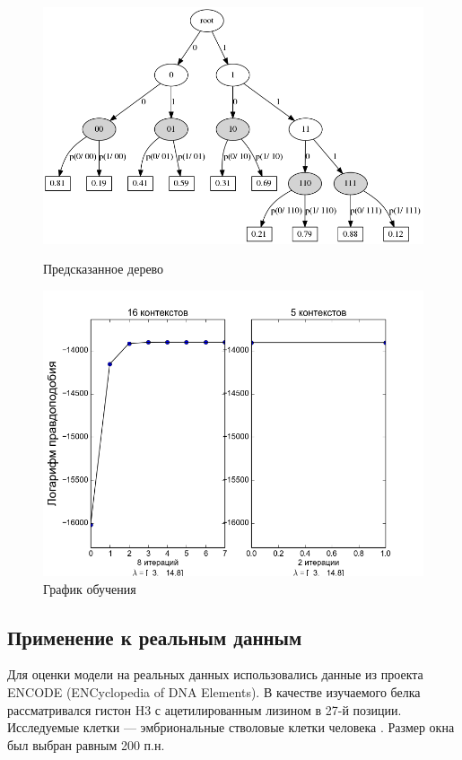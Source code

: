 \documentclass{matmex-diploma-custom}
\begin{document}
\begin{figure}[h!]
\begin{minipage}[b]{0.49 \textwidth}
\end{minipage}
\hfil \hfil%
\begin{minipage}[b]{0.49 \textwidth}
	\includegraphics[scale=0.3]{img/sample/predicted_trie.png}
	\centering
	\caption{ Предсказанное дерево }
	\label{fig:sample_vlhmm_predicted_trie}
\end{minipage}
\begin{minipage}[b]{0.8 \textwidth}
	\includegraphics[scale=0.4]{img/sample/plot_.png}
	\centering
	\caption{ График обучения }
	\label{fig:sample_vlhmm_log_likelihood}
\end{minipage}
\end{figure}

\subsection{Применение к реальным данным}
Для оценки модели на реальных данных использовались данные из проекта ENCODE (ENCyclopedia of DNA Elements).
В качестве изучаемого белка рассматривался гистон H3 с ацетилированным лизином в 27-й позиции. Исследуемые клетки --- эмбриональные стволовые клетки человека \cite{ENCODE}.
Размер окна был выбран равным 200 п.н.
\end{document}
